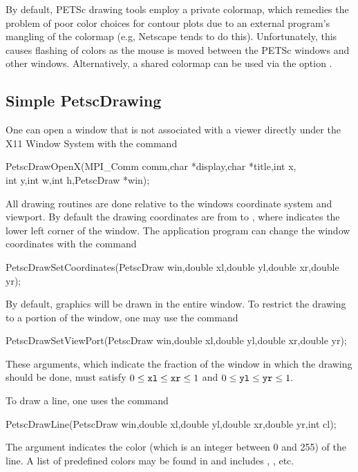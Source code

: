 {{{\medskip
By default, PETSc drawing tools employ a private colormap,
which remedies the problem of poor color choices for contour plots due
to an external program's mangling of the colormap (e.g, Netscape tends
to do this).
Unfortunately, this causes flashing of colors as the mouse is moved
between the PETSc windows and other windows.  Alternatively, a shared
colormap can be used via the option .

\subsection{Simple PetscDrawing}

One can open a window that is not associated with a viewer directly 
under the X11 Window System with the
command  
\begin{tabbing}
  PetscDrawOpenX(MPI\_Comm comm,char *display,char *title,int x,\\
                 int y,int w,int h,PetscDraw *win);
\end{tabbing}
All drawing routines are done relative to the windows coordinate system 
and viewport. By default the drawing coordinates are from  to 
, where  indicates the lower left corner of the 
window. The application program can change the window coordinates with the 
command  
\begin{tabbing}
  PetscDrawSetCoordinates(PetscDraw win,double xl,double yl,double xr,double yr);
\end{tabbing}
By default, graphics will be drawn in the entire window. To restrict the 
drawing to a portion of the window, one may 
use the command 
\begin{tabbing}
  PetscDrawSetViewPort(PetscDraw win,double xl,double yl,double xr,double yr);
\end{tabbing}
These arguments, which indicate the fraction of the window in which the 
drawing should be done, must satisfy 
$ 0 \le {\tt xl} \le {\tt xr} \le 1 $ and $ 0 \le {\tt yl} \le {\tt yr} \le 1.$ 

To draw a line, one uses
 the command  
\begin{tabbing}
  PetscDrawLine(PetscDraw win,double xl,double yl,double xr,double yr,int cl);
\end{tabbing}
The argument  indicates the color (which is an integer between 0 and 255)
of the line. A list of predefined colors may be found in 
and includes , ,  etc.

}}}

